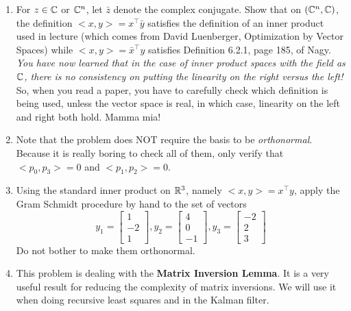\documentclass[letterpaper]{article}
\begin{document}
\begin{enumerate}


\item  For $z\in \mathbb C$ or $\mathbb C^n$, let $\bar{z}$ denote the complex conjugate. Show that on $(\mathbb C^n, \mathbb C)$, the definition $<x,y> = x^\top \bar{y}$ satisfies the definition of an inner product used in lecture (which comes from David Luenberger, Optimization by Vector Spaces) while $<x,y> = \bar{x}^\top y$ satisfies Definition 6.2.1, page 185, of Nagy.  \textit{You have now learned that in the case of inner product spaces with the field as $\mathbb C$, there is no consistency on putting the linearity on the right versus the left!} So, when you read a paper, you have to carefully check which definition is being used, unless the vector space is real, in which case, linearity on the left and right both hold. Mamma mia!


\item {}  Note that the problem does NOT require the basis to be \textit{orthonormal}. Because it is really boring to check all of them, only verify that $<p_0,p_3>=0$ and $<p_1,p_2>=0$.

\item Using the standard inner product on $\mathbb R^3$, namely $<x,y>=x^\top y$, apply the Gram Schmidt procedure by hand to the set of vectors
$$y_1=\begin{bmatrix} 1 \\ -2\\ 1 \end{bmatrix},   y_2=\begin{bmatrix} 4 \\ 0\\ -1 \end{bmatrix},  y_3=\begin{bmatrix} -2 \\ 2\\ 3 \end{bmatrix}$$
Do not bother to make them orthonormal.

\item This problem is dealing with the \textbf{Matrix Inversion Lemma}. It is a very useful result for reducing the complexity of matrix inversions. We will use it when doing recursive least squares and in the Kalman filter.

     \begin{enumerate}
\setlength{\itemsep}{.1in}
\renewcommand{\labelenumi}{(\alph{enumi})}


\end{enumerate}
\end{enumerate}
\end{document}

